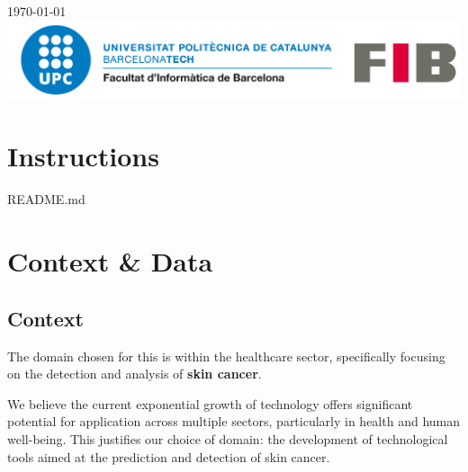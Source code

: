 \documentclass[12pt]{article}
\begin{document}
\begin{titlepage}
{\large \today}\\[2cm] %


\includegraphics[scale=0.3]{logo-upc.png}\\[1cm]
 

\vfill %

\end{titlepage}

\newpage

\tableofcontents

\newpage


\newpage

\section{Instructions}

README.md

\newpage

\section{Context \& Data}

\subsection{Context}
The domain chosen for this is within the healthcare sector, specifically focusing on the detection and analysis of \textbf{skin cancer}.

We believe the current exponential growth of technology offers significant potential for application across multiple sectors, particularly in health and human well-being. This justifies our choice of domain: the development of technological tools aimed at the prediction and detection of skin cancer.
\end{document}
